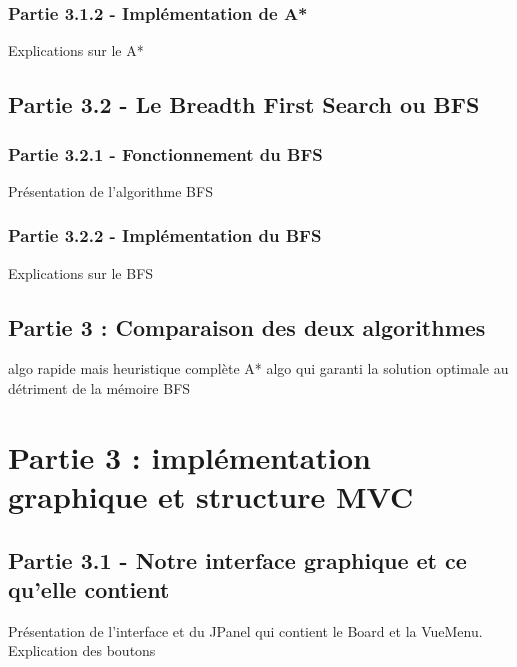 \documentclass{beamer} %
\begin{document}
		\subsubsection{Partie 3.1.2 - Implémentation de A*}
\begin{frame}[plain]
Explications sur le A*
\end{frame}

	\subsection{Partie 3.2 - Le Breadth First Search ou BFS}
		\subsubsection{Partie 3.2.1 - Fonctionnement du BFS}
\begin{frame}[plain]
Présentation de l'algorithme BFS
\end{frame}
		\subsubsection{Partie 3.2.2 - Implémentation du BFS}
\begin{frame}[plain]
Explications sur le BFS
\end{frame}
	\subsection{Partie 3 : Comparaison des deux algorithmes}
\begin{frame}[plain]
algo rapide mais heuristique complète A*
algo qui garanti la solution optimale au détriment de la mémoire BFS
\end{frame}

\section{Partie 3 : implémentation graphique et structure MVC}
\begin{frame}[plain]
\end{frame}
	\subsection{Partie 3.1 - Notre interface graphique et ce qu'elle contient}
\begin{frame}[plain]
Présentation de l'interface et du JPanel qui contient le Board et la VueMenu.
Explication des boutons
\end{frame}
\end{document}
